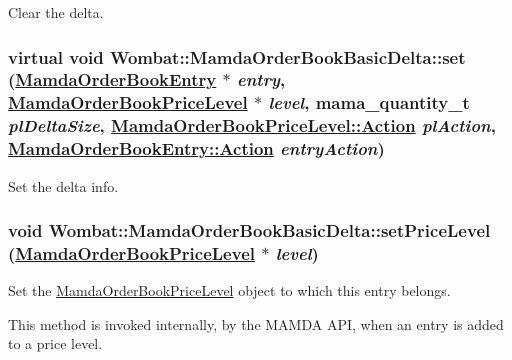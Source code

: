 Clear the delta. 

\hypertarget{classWombat_1_1MamdaOrderBookBasicDelta_7d5c8a70ea4d2d9acd4ff67426837a3c}{
\subsubsection[set]{\setlength{\rightskip}{0pt plus 5cm}virtual void Wombat::Mamda\-Order\-Book\-Basic\-Delta::set (\hyperlink{classWombat_1_1MamdaOrderBookEntry}{Mamda\-Order\-Book\-Entry} $\ast$ {\em entry}, \hyperlink{classWombat_1_1MamdaOrderBookPriceLevel}{Mamda\-Order\-Book\-Price\-Level} $\ast$ {\em level}, mama\_\-quantity\_\-t {\em pl\-Delta\-Size}, \hyperlink{classWombat_1_1MamdaOrderBookPriceLevel_bd3407b4250fc6f7a42d94b6d32e358a}{Mamda\-Order\-Book\-Price\-Level::Action} {\em pl\-Action}, \hyperlink{classWombat_1_1MamdaOrderBookEntry_fc6cb1d67c7601d093a36f59cf9bcef4}{Mamda\-Order\-Book\-Entry::Action} {\em entry\-Action})}}
\label{classWombat_1_1MamdaOrderBookBasicDelta_7d5c8a70ea4d2d9acd4ff67426837a3c}


Set the delta info. 

\hypertarget{classWombat_1_1MamdaOrderBookBasicDelta_793e97408911d035d6f6c0b29f0ea152}{
\subsubsection[setPriceLevel]{\setlength{\rightskip}{0pt plus 5cm}void Wombat::Mamda\-Order\-Book\-Basic\-Delta::set\-Price\-Level (\hyperlink{classWombat_1_1MamdaOrderBookPriceLevel}{Mamda\-Order\-Book\-Price\-Level} $\ast$ {\em level})}}
\label{classWombat_1_1MamdaOrderBookBasicDelta_793e97408911d035d6f6c0b29f0ea152}


Set the \hyperlink{classWombat_1_1MamdaOrderBookPriceLevel}{Mamda\-Order\-Book\-Price\-Level} object to which this entry belongs. 

This method is invoked internally, by the MAMDA API, when an entry is added to a price level.

